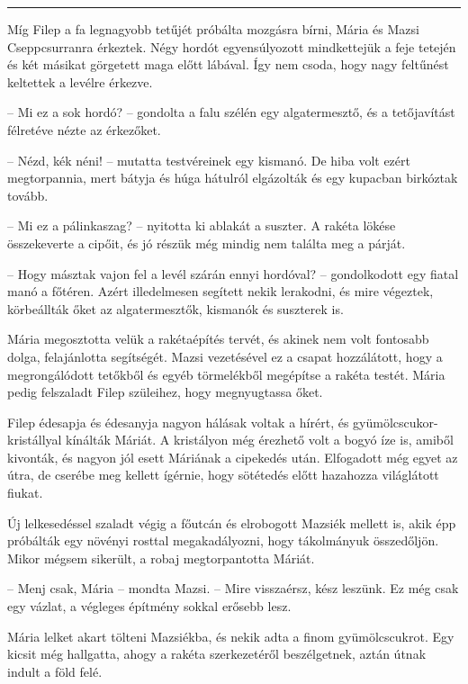 \documentclass[10pt]{memoir}
\renewcommand{\pfbreakdisplay}{\bigskip \ding{166} \bigskip}
\newcommand{\secbreak}{\fancybreak{\pfbreakdisplay}\indent}
\begin{document}
\secbreak

Míg Filep a fa legnagyobb tetűjét próbálta mozgásra bírni, Mária és Mazsi
Cseppcsurranra érkeztek. Négy hordót egyensúlyozott mindkettejük a feje tetején
és két másikat görgetett maga előtt lábával. Így nem csoda, hogy nagy feltűnést
keltettek a levélre érkezve.

-- Mi ez a sok hordó? -- gondolta a falu szélén egy algatermesztő, és a
tetőjavítást félretéve nézte az érkezőket.

-- Nézd, kék néni! -- mutatta testvéreinek egy kismanó. De hiba volt ezért
megtorpannia, mert bátyja és húga hátulról elgázolták és egy kupacban birkóztak
tovább.

-- Mi ez a pálinkaszag? -- nyitotta ki ablakát a suszter. A rakéta lökése
összekeverte a cipőit, és jó részük még mindig nem találta meg a párját.

-- Hogy másztak vajon fel a levél szárán ennyi hordóval? -- gondolkodott egy
fiatal manó a főtéren. Azért illedelmesen segített nekik lerakodni, és mire
végeztek, körbeállták őket az algatermesztők, kismanók és suszterek is.

Mária megosztotta velük a rakétaépítés tervét, és akinek nem volt fontosabb
dolga, felajánlotta segítségét. Mazsi vezetésével ez a csapat hozzálátott, hogy
a megrongálódott tetőkből és egyéb törmelékből megépítse a rakéta testét. Mária
pedig felszaladt Filep szüleihez, hogy megnyugtassa őket.

Filep édesapja és édesanyja nagyon hálásak voltak a hírért, és
gyümölcscukor-kristállyal kínálták Máriát. A kristályon még érezhető volt a
bogyó íze is, amiből kivonták, és nagyon jól esett Máriának a cipekedés után.
Elfogadott még egyet az útra, de cserébe meg kellett ígérnie, hogy sötétedés
előtt hazahozza világlátott fiukat.

Új lelkesedéssel szaladt végig a főutcán és elrobogott Mazsiék mellett is, akik
épp próbálták egy növényi rosttal megakadályozni, hogy tákolmányuk összedőljön.
Mikor mégsem sikerült, a robaj megtorpantotta Máriát.

-- Menj csak, Mária -- mondta Mazsi. -- Mire visszaérsz, kész leszünk. Ez
még csak egy vázlat, a végleges építmény sokkal erősebb lesz.

Mária lelket akart tölteni Mazsiékba, és nekik adta a finom gyümölcscukrot. Egy
kicsit még hallgatta, ahogy a rakéta szerkezetéről beszélgetnek, aztán útnak
indult a föld felé.
\end{document}
